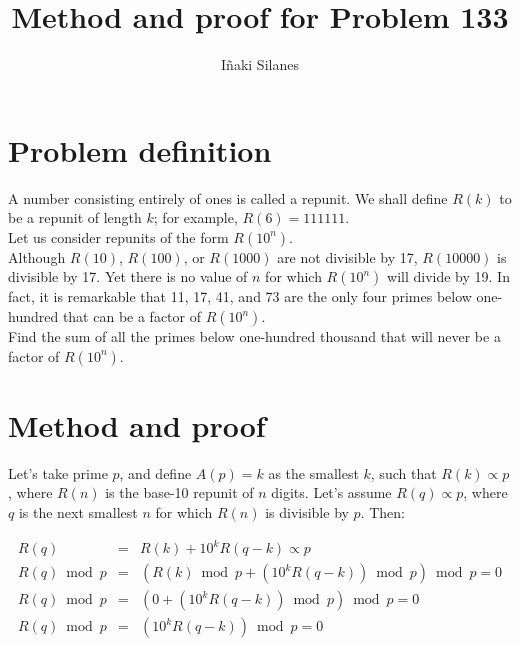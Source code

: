 \documentclass[english]{article}
\begin{document}
\newcommand{\mc}{\multicolumn}
\newcommand{\mr}{\multirow}
\newcommand{\cw}{\columnwidth}
\newcommand{\ig}[2]{\texttt{[image: \#2]}}

\title{Method and proof for Problem 133}
\author{I\~naki Silanes}
\maketitle

\section{Problem definition}

A number consisting entirely of ones is called a repunit. We shall define $R(k)$ to be a repunit of length $k$; for example, $R(6) = 111111$.\\

Let us consider repunits of the form $R(10^n)$.\\

Although $R(10)$, $R(100)$, or $R(1000)$ are not divisible by 17, $R(10000)$ is divisible by 17. Yet there is no value of $n$ for which $R(10^n)$ will divide by 19. In fact, it is remarkable that 11, 17, 41, and 73 are the only four primes below one-hundred that can be a factor of $R(10^n)$.\\

Find the sum of all the primes below one-hundred thousand that will never be a factor of $R(10^n)$.

\section{Method and proof}

Let's take prime $p$, and define $A(p) = k$ as the smallest $k$, such that $R(k) \propto p$, where $R(n)$ is the base-10 repunit of $n$ digits. Let's assume $R(q) \propto p$, where $q$ is the next smallest $n$ for which $R(n)$ is divisible by $p$. Then:

\begin{eqnarray}
      R(q) & = & R(k) + 10^k R(q-k) \propto p \\
R(q) \bmod p & = & ( R(k) \bmod p + (10^k R(q-k)) \bmod p ) \bmod p = 0 \\
R(q) \bmod p & = & (0 + (10^k R(q-k)) \bmod p ) \bmod p = 0 \\
R(q) \bmod p & = & (10^k R(q-k)) \bmod p = 0 \label{eq:qfirst}
\end{eqnarray}\\
\end{document}

